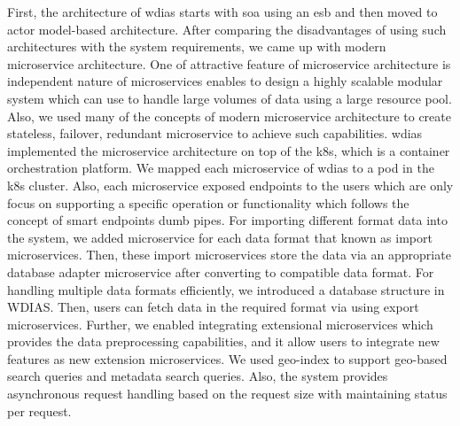 First, the architecture of \acrshort{wdias} starts with \acrshort{soa} using an \acrfull{esb} and then moved to actor model-based architecture. After comparing the disadvantages of using such architectures with the system requirements, we came up with modern microservice architecture. One of attractive feature of microservice architecture is independent nature of microservices enables to design a highly scalable modular system which can use to handle large volumes of data using a large resource pool. Also, we used many of the concepts of modern microservice architecture to create stateless, failover, redundant microservice to achieve such capabilities. \acrshort{wdias} implemented the microservice architecture on top of the \acrshort{k8s}, which is a container orchestration platform. We mapped each microservice of \acrshort{wdias} to a pod in the \acrshort{k8s} cluster. Also, each microservice exposed endpoints to the users which are only focus on supporting a specific operation or functionality which follows the concept of smart endpoints dumb pipes. For importing different format data into the system, we added microservice for each data format that known as import microservices. Then, these import microservices store the data via an appropriate database adapter microservice after converting to compatible data format. For handling multiple data formats efficiently, we introduced a database structure in WDIAS. Then, users can fetch data in the required format via using export microservices. Further, we enabled integrating extensional microservices which provides the data preprocessing capabilities, and it allow users to integrate new features as new extension microservices. We used geo-index to support geo-based search queries and metadata search queries. Also, the system provides asynchronous request handling based on the request size with maintaining status per request.

